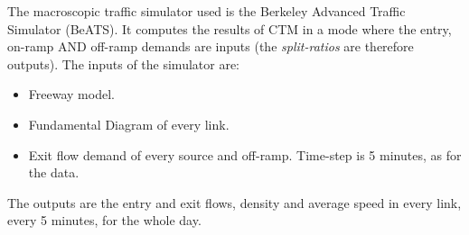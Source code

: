 The macroscopic traffic simulator used is the Berkeley Advanced Traffic Simulator (BeATS). It computes the results of CTM in a mode where the entry, on-ramp AND off-ramp demands are inputs (the \emph{split-ratios} are therefore outputs).
The inputs of the simulator are:
\begin{itemize}
	\item Freeway model.
	\item Fundamental Diagram of every link.
	\item Exit flow demand of every source and off-ramp. Time-step is 5 minutes, as for the data.
\end{itemize}
The outputs are the entry and exit flows, density and average speed in every link, every 5 minutes, for the whole day.
